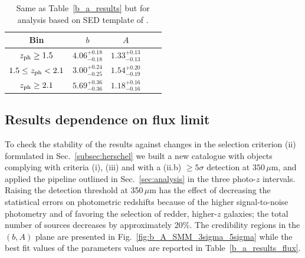 \begin{table}[t]
\centering
\begin{threeparttable}
\begin{tabular}{ccccc}
\toprule
\midrule
Bin & $b$ & $A$ \\
\midrule
$z_{\rm{ph}} \ge 1.5$  & $4.06^{+0.18}_{-0.18}$  &  $1.33^{+0.13}_{-0.13}$ \\
$1.5 \le z_{\rm{ph}} < 2.1$  & $3.00^{+0.24}_{-0.25}$   &  $1.54^{+0.20}_{-0.19}$  \\
$z_{\rm{ph}} \ge 2.1$  & $5.69^{+0.36}_{-0.36}$   &  $1.18^{+0.16}_{-0.16}$ \\
\bottomrule
\end{tabular}
\end{threeparttable}
\caption{Same as Table~\eqref{b_a_results} but for analysis based on SED template of \cite{Pearson2013}.  \label{b_a_results_Pearson}}
\end{table}


\subsection{Results dependence on flux limit}
\label{sec:flux_test}
To check the stability of the results against changes in the selection criterion (ii) formulated in Sec.~\eqref{subsec:herschel} we built a new catalogue with objects complying with criteria (i), (iii) and with a (ii.b) $\ge 5\sigma$ detection at $350\,\mu$m, and applied the pipeline outlined in Sec.~\eqref{sec:analysis} in the three photo-$z$ intervals. Raising the detection threshold at 350\,$\mu$m has the effect of decreasing the statistical errors on photometric redshifts because of the higher signal-to-noise photometry and of favoring the selection of redder, higher-$z$ galaxies; the total number of sources decreases by approximately 20\%. The credibility regions in the $(b,A)$ plane are presented in Fig.~\eqref{fig:b_A_SMM_3sigma_5sigma} while the best fit values of the parameters values are reported in Table~\eqref{b_a_results_flux}.

